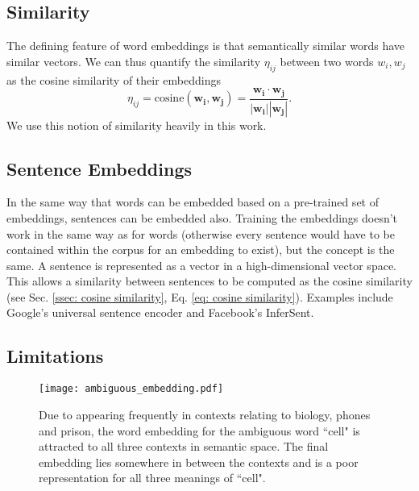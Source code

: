     \subsection{Similarity \label{ssec: cosine similarity}}
        The defining feature of word \glspl{embedding} is that semantically similar words have similar vectors. We can thus quantify the similarity $\eta_{ij}$ between two words $w_i, w_j$ as the cosine similarity of their \glspl{embedding}
        \begin{equation}
            \eta_{ij} = \text{cosine}(\mathbf{w_i}, \mathbf{w_j}) = \frac{\mathbf{w_i} \cdot \mathbf{w_j}}{|\mathbf{w_i}| |\mathbf{w_j}|}.
            \label{eq: cosine similarity}
        \end{equation}
        We use this notion of similarity heavily in this work.

    \subsection{Sentence Embeddings \label{ssec: utterance embeddings}}

    In the same way that words can be embedded based on a pre-trained set of \glspl{embedding}, sentences can be embedded also. Training the \glspl{embedding} doesn't work in the same way as for words (otherwise every sentence would have to be contained within the corpus for an \gls{embedding} to exist), but the concept is the same. A sentence is represented as a vector in a high-dimensional vector space. This allows a similarity between sentences to be computed as the cosine similarity (see Sec. \ref{ssec: cosine similarity}, Eq. \ref{eq: cosine similarity}). Examples include Google's universal sentence encoder\cite{GoogleEncoder} and Facebook's InferSent\cite{infersent}.

    \subsection{Limitations}
        \begin{figure}[h]
            \centering
            \texttt{[image: ambiguous\_embedding.pdf]}
            \caption{Due to appearing frequently in contexts relating to biology, phones and prison, the word \gls{embedding} for the ambiguous word ``cell" is attracted to all three contexts in semantic space. The final \gls{embedding} lies somewhere in between the contexts and is a poor representation for all three meanings of ``cell".}
            \label{fig:ambiguous_embedding}
        \end{figure}

